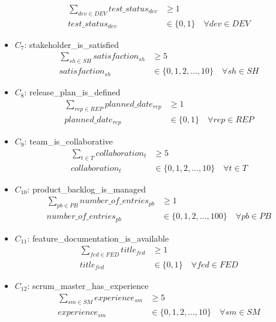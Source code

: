 \documentclass{article}
\begin{document}
\begin{itemize}
        \begin{align*}
            \sum_{dev \in DEV} test\_status_{dev} &\geq 1 \\
            test\_status_{dev} &\in \{0, 1\} \quad \forall dev \in DEV
        \end{align*}
    \item $C_7$: stakeholder\_is\_satisfied
        \begin{align*}
            \sum_{sh \in SH} satisfaction_{sh} &\geq 5 \\
            satisfaction_{sh} &\in \{0, 1, 2, ..., 10\} \quad \forall sh \in SH
        \end{align*}
    \item $C_8$: release\_plan\_is\_defined
        \begin{align*}
            \sum_{rep \in REP} planned\_date_{rep} &\geq 1 \\
            planned\_date_{rep} &\in \{0, 1\} \quad \forall rep \in REP
        \end{align*}
    \item $C_9$: team\_is\_collaborative
        \begin{align*}
            \sum_{t \in T} collaboration_t &\geq 5 \\
            collaboration_t &\in \{0, 1, 2, ..., 10\} \quad \forall t \in T
        \end{align*}
    \item $C_{10}$: product\_backlog\_is\_managed
        \begin{align*}
            \sum_{pb \in PB} number\_of\_entries_{pb} &\geq 1 \\
            number\_of\_entries_{pb} &\in \{0, 1, 2, ..., 100\} \quad \forall pb \in PB
        \end{align*}
    \item $C_{11}$: feature\_documentation\_is\_available
        \begin{align*}
            \sum_{fed \in FED} title_{fed} &\geq 1 \\
            title_{fed} &\in \{0, 1\} \quad \forall fed \in FED
        \end{align*}
    \item $C_{12}$: scrum\_master\_has\_experience
        \begin{align*}
            \sum_{sm \in SM} experience_{sm} &\geq 5 \\
            experience_{sm} &\in \{0, 1, 2, ..., 10\} \quad \forall sm \in SM
        \end{align*}

\end{itemize}
\end{document}
